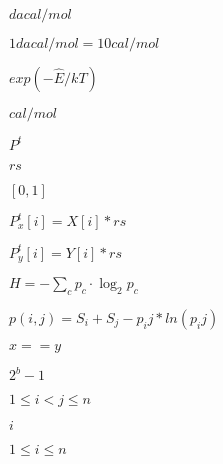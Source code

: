 \documentclass{article}
\begin{document}
$ dacal/mol $
\pagebreak

$ 1 dacal/mol = 10 cal/mol $
\pagebreak

$ exp(- \hat{E} / kT) $
\pagebreak

$ cal/mol $
\pagebreak

$P^t$
\pagebreak

$rs$
\pagebreak

$[0,1]$
\pagebreak

$ P^{t}_x[i] = X[i] * rs$
\pagebreak

$P^{t}_y[i] = Y[i] * rs$
\pagebreak

$ H = - \sum_c p_c \cdot \log_2 p_c $
\pagebreak

$ p(i,j) = S_i + S_j - p_ij*ln(p_ij) $
\pagebreak

$x == y $
\pagebreak

$2^b -1$
\pagebreak

$ 1 \leq i < j \leq n $
\pagebreak

$i $
\pagebreak

$ 1 \leq i \leq n $
\pagebreak
\end{document}
